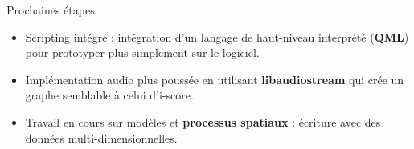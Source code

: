 \begin{block}{Prochaines étapes}
    \begin{itemize}
        \item Scripting intégré : intégration d'un langage de haut-niveau interprété (\textbf{QML}) pour prototyper plus simplement sur le logiciel.
        \item Implémentation audio plus poussée en utilisant \textbf{libaudiostream}\cite{letz_specification_2014} qui crée un graphe semblable à celui d'i-score.
        \item Travail en cours sur modèles et \textbf{processus spatiaux} : écriture avec des données multi-dimensionnelles.
    \end{itemize}
\end{block}